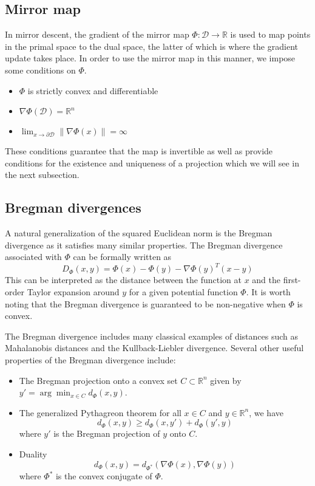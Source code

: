 \subsection{Mirror map}
In mirror descent, the gradient of the mirror map $\Phi: \mathcal{D} \rightarrow \mathbb{R}$ is used to map points in the primal space to the dual space, the latter of which is where the gradient update takes place. In order to use the mirror map in this manner, we impose some conditions on $\Phi$.
\begin{itemize}
\item $\Phi$ is strictly convex and differentiable
\item $\nabla \Phi(\mathcal{D}) = \mathbb{R}^n$
\item $\lim_{x \rightarrow \partial \mathcal{D}} \|\nabla \Phi(x)\| = \infty$
\end{itemize}
These conditions guarantee that the map is invertible as well as provide conditions for the existence and uniqueness of a projection which we will see in the next subsection.

\subsection{Bregman divergences}
A natural generalization of the squared Euclidean norm is the Bregman divergence as it satisfies many similar properties. The Bregman divergence associated with $\Phi$ can be formally written as
$$ D_{\Phi}(x,y) = \Phi(x) - \Phi(y) - \nabla \Phi(y)^T(x-y)$$
This can be interpreted as the distance between the function at $x$ and the first-order Taylor expansion around $y$ for a given potential function $\Phi$. It is worth noting that the Bregman divergence is guaranteed to be non-negative when $\Phi$ is convex.

The Bregman divergence includes many classical examples of distances such as Mahalanobis distances and the Kullback-Liebler divergence. Several other useful properties of the Bregman divergence include:
\begin{itemize}
    \item The Bregman projection onto a convex set $C \subset \mathbb{R}^n$ given by $y' = \arg\min_{x \in C} d_{\Phi}(x,y)$.
    \item The generalized Pythagreon theorem for all $x \in C$ and $y \in \mathbb{R}^n$, we have
    $$d_{\Phi}(x,y) \geq d_{\Phi}(x,y') + d_{\Phi}(y',y)$$
    where $y'$ is the Bregman projection of $y$ onto $C$.
    \item Duality
    $$d_{\Phi}(x,y) = d_{\Phi^*}(\nabla \Phi(x), \nabla \Phi(y))$$
    where $\Phi^*$ is the convex conjugate of $\Phi$.
\end{itemize}


